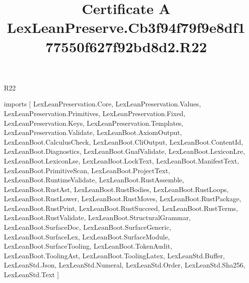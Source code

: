 \begin{lexlean}{R22}
\title{Certificate A LexLeanPreserve.Cb3f94f79f9e8df177550f627f92bd8d2.R22}
\begin{coremodule}
imports [
  LexLeanPreservation.Core,
  LexLeanPreservation.Values,
  LexLeanPreservation.Primitives,
  LexLeanPreservation.Fixed,
  LexLeanPreservation.Keys,
  LexLeanPreservation.Templates,
  LexLeanPreservation.Validate,
  LexLeanBoot.AxiomOutput,
  LexLeanBoot.CalculusCheck,
  LexLeanBoot.CliOutput,
  LexLeanBoot.ContentId,
  LexLeanBoot.Diagnostics,
  LexLeanBoot.GnafValidate,
  LexLeanBoot.LexiconLre,
  LexLeanBoot.LexiconLse,
  LexLeanBoot.LockText,
  LexLeanBoot.ManifestText,
  LexLeanBoot.PrimitiveScan,
  LexLeanBoot.ProjectText,
  LexLeanBoot.RuntimeValidate,
  LexLeanBoot.RustAssemble,
  LexLeanBoot.RustAst,
  LexLeanBoot.RustBodies,
  LexLeanBoot.RustLoops,
  LexLeanBoot.RustLower,
  LexLeanBoot.RustMoves,
  LexLeanBoot.RustPackage,
  LexLeanBoot.RustPrint,
  LexLeanBoot.RustSucceed,
  LexLeanBoot.RustTerms,
  LexLeanBoot.RustValidate,
  LexLeanBoot.StructuralGrammar,
  LexLeanBoot.SurfaceDoc,
  LexLeanBoot.SurfaceGeneric,
  LexLeanBoot.SurfaceLex,
  LexLeanBoot.SurfaceModule,
  LexLeanBoot.SurfaceTooling,
  LexLeanBoot.TokenAudit,
  LexLeanBoot.ToolingAst,
  LexLeanBoot.ToolingLatex,
  LexLeanStd.Buffer,
  LexLeanStd.Json,
  LexLeanStd.Numeral,
  LexLeanStd.Order,
  LexLeanStd.Sha256,
  LexLeanStd.Text
]


\end{coremodule}
\end{lexlean}
